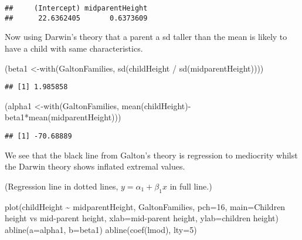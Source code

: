\documentclass[
]{article}
\newenvironment{Shaded}{\begin{snugshade}}{\end{snugshade}}
\newcommand{\AttributeTok}[1]{\textcolor[rgb]{0.77,0.63,0.00}{#1}}
\newcommand{\DecValTok}[1]{\textcolor[rgb]{0.00,0.00,0.81}{#1}}
\newcommand{\FunctionTok}[1]{\textcolor[rgb]{0.00,0.00,0.00}{#1}}
\newcommand{\NormalTok}[1]{#1}
\newcommand{\OtherTok}[1]{\textcolor[rgb]{0.56,0.35,0.01}{#1}}
\newcommand{\SpecialCharTok}[1]{\textcolor[rgb]{0.00,0.00,0.00}{#1}}
\newcommand{\StringTok}[1]{\textcolor[rgb]{0.31,0.60,0.02}{#1}}
\begin{document}
\begin{verbatim}
##     (Intercept) midparentHeight 
##      22.6362405       0.6373609
\end{verbatim}

Now using Darwin's theory that a parent a sd taller than the mean is
likely to have a child with same characteristics.

\begin{Shaded}
\begin{Highlighting}[]
\NormalTok{(beta1 }\OtherTok{\textless{}{-}}\FunctionTok{with}\NormalTok{(GaltonFamilies, }\FunctionTok{sd}\NormalTok{(childHeight }\SpecialCharTok{/} \FunctionTok{sd}\NormalTok{(midparentHeight))))}
\end{Highlighting}
\end{Shaded}

\begin{verbatim}
## [1] 1.985858
\end{verbatim}

\begin{Shaded}
\begin{Highlighting}[]
\NormalTok{(alpha1 }\OtherTok{\textless{}{-}}\FunctionTok{with}\NormalTok{(GaltonFamilies, }\FunctionTok{mean}\NormalTok{(childHeight)}\SpecialCharTok{{-}}\NormalTok{beta1}\SpecialCharTok{*}\FunctionTok{mean}\NormalTok{(midparentHeight)))}
\end{Highlighting}
\end{Shaded}

\begin{verbatim}
## [1] -70.68889
\end{verbatim}

We see that the black line from Galton's theory is regression to
mediocrity whilst the Darwin theory shows inflated extremal values.

(Regression line in dotted lines, \(y=\alpha_1+\beta_1 x\) in full
line.)

\begin{Shaded}
\begin{Highlighting}[]
\FunctionTok{plot}\NormalTok{(childHeight }\SpecialCharTok{\textasciitilde{}}\NormalTok{ midparentHeight, GaltonFamilies, }\AttributeTok{pch=}\DecValTok{16}\NormalTok{, }\AttributeTok{main=}\StringTok{\textquotesingle{}Children height vs mid{-}parent height\textquotesingle{}}\NormalTok{, }\AttributeTok{xlab=}\StringTok{\textquotesingle{}mid{-}parent height\textquotesingle{}}\NormalTok{, }\AttributeTok{ylab=}\StringTok{\textquotesingle{}children height\textquotesingle{}}\NormalTok{)}
\FunctionTok{abline}\NormalTok{(}\AttributeTok{a=}\NormalTok{alpha1, }\AttributeTok{b=}\NormalTok{beta1)}
\FunctionTok{abline}\NormalTok{(}\FunctionTok{coef}\NormalTok{(lmod), }\AttributeTok{lty=}\DecValTok{5}\NormalTok{)}
\end{Highlighting}
\end{Shaded}
\end{document}
